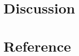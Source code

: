 \documentclass[letterpaper, 10 pt, conference]{ieeeconf}  %
\begin{document}
\section{Discussion}

\section{Reference}


\addtolength{\textheight}{-12cm}   %







\end{document}
